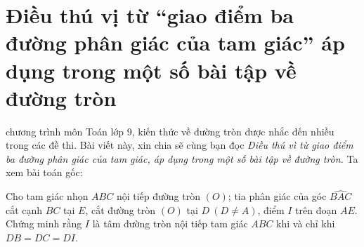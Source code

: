 \section{Điều thú vị từ “giao điểm ba đường phân giác của tam giác” áp dụng trong một số bài tập về đường tròn}
\begin{center}
\textbf{\color{violet}{Ngô Văn Điềm\\
(GV THCS Lê Ninh, Kinh Môn, Hải Dương)}}
\end{center}
 chương trình môn Toán lớp 9, kiến thức về đường tròn được nhắc đến nhiều trong các đề thi. Bài viết này, xin chia sẽ cùng bạn đọc {\it Điều thú vì từ giao điểm ba đường phân giác của tam giác, áp dụng trong một số bài tập về đường tròn.} Ta xem bài toán gốc: 
\begin{bt}%
Cho tam giác nhọn $ABC$ nội tiếp đường tròn $(O)$; tia phân giác của góc $\widehat{BAC}$ cắt cạnh $BC$ tại $E$, cắt đường tròn $(O)$ tại $D\ (D\neq A)$, điểm $I$ trên đoạn $AE$. Chứng minh rằng $I$ là tâm đường tròn nội tiếp tam giác $ABC$ khi và chỉ khi $DB=DC=DI$.
\end{bt}
